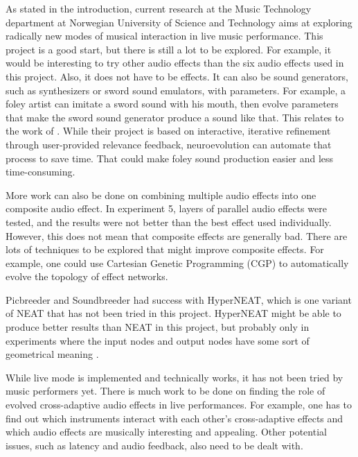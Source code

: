 As stated in the introduction, current research at the Music Technology department at Norwegian University of Science and Technology aims at exploring radically new modes of musical interaction in live music performance. This project is a good start, but there is still a lot to be explored. For example, it would be interesting to try other audio effects than the six audio effects used in this project. Also, it does not have to be effects. It can also be sound generators, such as synthesizers or sword sound emulators, with parameters. For example, a foley artist can imitate a sword sound with his mouth, then evolve parameters that make the sword sound generator produce a sound like that. This relates to the work of \cite{cartwright2014}. While their project is based on interactive, iterative refinement through user-provided relevance feedback, neuroevolution can automate that process to save time. That could make foley sound production easier and less time-consuming.

More work can also be done on combining multiple audio effects into one composite audio effect. In experiment 5, layers of parallel audio effects were tested, and the results were not better than the best effect used individually. However, this does not mean that composite effects are generally bad. There are lots of techniques to be explored that might improve composite effects. For example, one could use Cartesian Genetic Programming (CGP) to automatically evolve the topology of effect networks.

Picbreeder \citep{secretan2008} and Soundbreeder \citep{ye2014} had success with HyperNEAT, which is one variant of NEAT that has not been tried in this project. HyperNEAT might be able to produce better results than NEAT in this project, but probably only in experiments where the input nodes and output nodes have some sort of geometrical meaning \citep{whiteson2013}.

While live mode is implemented and technically works, it has not been tried by music performers yet. There is much work to be done on finding the role of evolved cross-adaptive audio effects in live performances. For example, one has to find out which instruments interact with each other's cross-adaptive effects and which audio effects are musically interesting and appealing. Other potential issues, such as latency and audio feedback, also need to be dealt with.

